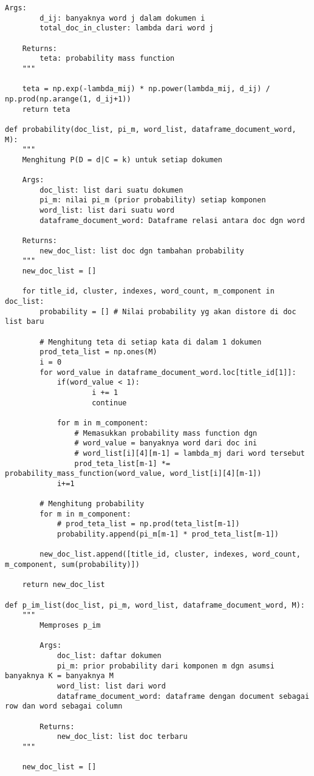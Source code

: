 \begin{lstlisting}[breaklines=true]
	Args:
		d_ij: banyaknya word j dalam dokumen i
		total_doc_in_cluster: lambda dari word j

	Returns:
		teta: probability mass function
	"""
	
	teta = np.exp(-lambda_mij) * np.power(lambda_mij, d_ij) / np.prod(np.arange(1, d_ij+1))
	return teta

def probability(doc_list, pi_m, word_list, dataframe_document_word, M):
	"""
	Menghitung P(D = d|C = k) untuk setiap dokumen
	
	Args:
		doc_list: list dari suatu dokumen
		pi_m: nilai pi_m (prior probability) setiap komponen
		word_list: list dari suatu word
		dataframe_document_word: Dataframe relasi antara doc dgn word

	Returns:
		new_doc_list: list doc dgn tambahan probability
	"""
	new_doc_list = []
	
	for title_id, cluster, indexes, word_count, m_component in doc_list:
		probability = [] # Nilai probability yg akan distore di doc list baru
		
		# Menghitung teta di setiap kata di dalam 1 dokumen
		prod_teta_list = np.ones(M)
		i = 0
		for word_value in dataframe_document_word.loc[title_id[1]]:
			if(word_value < 1):
					i += 1
					continue
			
			for m in m_component:
				# Memasukkan probability mass function dgn
				# word_value = banyaknya word dari doc ini
				# word_list[i][4][m-1] = lambda_mj dari word tersebut
				prod_teta_list[m-1] *= probability_mass_function(word_value, word_list[i][4][m-1])
			i+=1
		
		# Menghitung probability
		for m in m_component:
			# prod_teta_list = np.prod(teta_list[m-1])
			probability.append(pi_m[m-1] * prod_teta_list[m-1])
				
		new_doc_list.append([title_id, cluster, indexes, word_count, m_component, sum(probability)])
			
	return new_doc_list

def p_im_list(doc_list, pi_m, word_list, dataframe_document_word, M):
	"""
		Memproses p_im

		Args:
			doc_list: daftar dokumen
			pi_m: prior probability dari komponen m dgn asumsi banyaknya K = banyaknya M
			word_list: list dari word
			dataframe_document_word: dataframe dengan document sebagai row dan word sebagai column
			
		Returns:
			new_doc_list: list doc terbaru 
	"""
		
	new_doc_list = []
	

\end{lstlisting}
